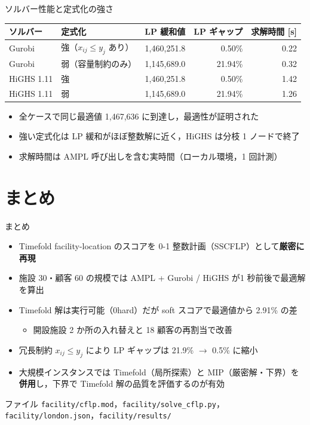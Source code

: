 \documentclass[aspectratio=169,11pt]{beamer}
\begin{document}
\begin{frame}{ソルバー性能と定式化の強さ}
  \small
  \begin{tabularx}{\textwidth}{l l R R R}
    \toprule
    ソルバー & 定式化 & LP 緩和値 & LP ギャップ & 求解時間 [s] \\
    \midrule
    Gurobi & 強（$x_{ij}\le y_j$ あり） & 1,460,251.8 & 0.50\% & 0.22 \\
    Gurobi & 弱（容量制約のみ） & 1,145,689.0 & 21.94\% & 0.32 \\
    HiGHS 1.11 & 強 & 1,460,251.8 & 0.50\% & 1.42 \\
    HiGHS 1.11 & 弱 & 1,145,689.0 & 21.94\% & 1.26 \\
    \bottomrule
  \end{tabularx}
  \vspace{0.8em}
  \begin{itemize}
    \item 全ケースで同じ最適値 1,467,636 に到達し，最適性が証明された
    \item 強い定式化は LP 緩和がほぼ整数解に近く，HiGHS は分枝 1 ノードで終了
    \item 求解時間は AMPL 呼び出しを含む実時間（ローカル環境，1 回計測）
  \end{itemize}
\end{frame}

\section{まとめ}

\begin{frame}{まとめ}
  \begin{itemize}
    \item Timefold facility-location のスコアを 0-1 整数計画（SSCFLP）として\textbf{厳密に再現}
    \item 施設 30・顧客 60 の規模では AMPL + Gurobi / HiGHS が\alert{1 秒前後で最適解}を算出
    \item Timefold 解は実行可能（0hard）だが soft スコアで最適値から 2.91\% の差
    \begin{itemize}
      \item 開設施設 2 か所の入れ替えと 18 顧客の再割当で改善
    \end{itemize}
    \item 冗長制約 $x_{ij} \le y_j$ により LP ギャップは 21.9\% $\to$ 0.5\% に縮小
    \item 大規模インスタンスでは Timefold（局所探索）と MIP（厳密解・下界）を
          \textbf{併用}し，下界で Timefold 解の品質を評価するのが有効
  \end{itemize}
  \vspace{0.5em}
  \begin{block}{ファイル}
    \footnotesize
    \texttt{facility/cflp.mod}，\texttt{facility/solve\_cflp.py}，\texttt{facility/london.json}，\texttt{facility/results/}
  \end{block}
\end{frame}
\end{document}
